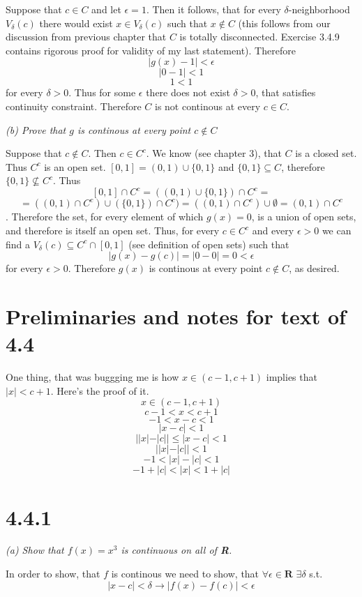 \documentclass[11pt,oneside,titlepage]{book}
\begin{document}
Suppose that $c \in C$ and let $\epsilon = 1$. Then it follows, that
for every $\delta$-neighborhood $V_\delta(c)$ there would exist
$x \in V_\delta(c)$ such that $x \notin C$ (this follows from our discussion
from previous chapter that $C$ is totally disconnected. Exercise 3.4.9
contains rigorous proof for validity of my last statement).
Therefore
$$|g(x) - 1| < \epsilon$$
$$|0 - 1| < 1$$
$$1 < 1$$
for every $\delta > 0$. Thus for some $\epsilon$ there does not exist
$\delta > 0$, that satisfies continuity constraint. Therefore
$C$ is not continous at every $c \in C$.

\textit{(b) Prove that $g$ is continous at every point $c \notin C$}

Suppose that $c \notin C$. Then $c \in C^c$. We know (see chapter 3), that
$C$ is a closed set. Thus $C^c$ is an open set.
$[0, 1] = (0, 1) \cup \{0, 1\}$ and $\{0, 1\}  \subseteq C$, therefore
$\{0, 1\}  \not \subseteq C^c$. Thus
$$[0, 1] \cap C^c = ((0, 1) \cup \{0, 1\}) \cap C^c =$$
$$= ((0, 1) \cap C^c) \cup (\{0, 1\}) \cap C^c) =
((0, 1) \cap C^c) \cup \emptyset 
= (0, 1) \cap C^c$$.
Therefore the set, for every element of which $g(x) = 0$, is a union of open sets, and therefore is 
itself an open set. Thus, for every $c \in C^c$ and every
$\epsilon > 0$ we can find a $V_\delta(c) \subseteq C^c \cap [0, 1]$ (see
definition of open sets) such that
$$|g(x) - g(c)| = |0 - 0| = 0 < \epsilon$$
for every $\epsilon > 0$. Therefore $g(x)$ is continous at every point
$c \notin C$, as desired.


\section*{Preliminaries and notes for text of 4.4}

One thing, that was buggging me is how $x \in (c - 1, c + 1)$ implies that
$|x| < c + 1$. Here's the proof of it.
$$x \in (c - 1, c + 1)$$
$$c - 1 < x < c + 1$$
$$- 1 < x - c <  1$$
$$|x - c| <  1$$
$$||x| - |c|| \leq |x - c| < 1 $$
$$||x| - |c||  < 1 $$
$$-1 < |x| - |c|  < 1 $$
$$-1 + |c| < |x| < 1 + |c|$$

\section*{4.4.1}

\textit{(a) Show that $f(x) = x^{3}$ is continuous on all of \textbf{R}.}

In order to show, that $f$ is continous we need to show, that $\forall
\epsilon \in \textbf{R}$ $\exists \delta$ s.t.
$$|x - c| < \delta \to |f(x) - f(c)| < \epsilon$$
\end{document}
